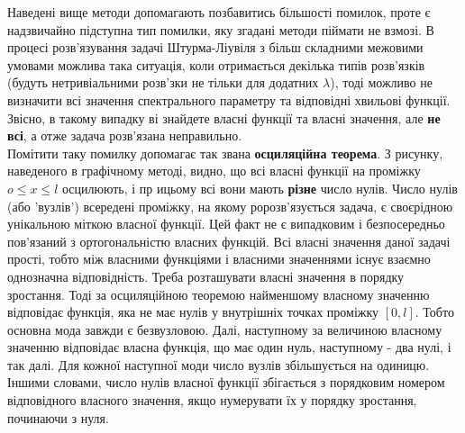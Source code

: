 \documentclass[a4paper, 14pt]{extreport}
\begin{document}
Наведені вище методи допомагають позбавитись більшості помилок, проте є надзвичайно підступна тип помилки, яку згадані методи піймати не взмозі. В процесі розв'язування задачі Штурма-Ліувіля з більш складними межовими умовами можлива така ситуація, коли отримається декілька типів розв'язків (будуть нетривіальними розв'зки не тільки для додатних $\lambda$), тоді можливо не визначити всі значення спектрального параметру та відповідні хвильові функції. Звісно, в такому випадку ві знайдете власні функції та власні значення, але \textbf{не всі}, а отже задача розв'язана неправильно.\\
Помітити таку помилку допомагає так звана \textbf{осциляційна теорема}. З рисунку, наведеного в графічному методі, видно, що всі власні функції на проміжку $o \leq x \leq l$ осцилюють, і пр ицьому всі вони мають \textbf{різне} число нулів. Число нулів (або 'вузлів') всередені проміжку, на якому ророзв’язується задача, є своєрідною унікальною міткою власної функції. Цей факт не є випадковим і безпосередньо пов’язаний з ортогональністю власних функцій. Всі власні значення даної задачі прості, тобто між власними функціями і власними значеннями існує взаємно однозначна відповідність. Треба розташувати власні значення в порядку зростання. Тоді за осциляційною теоремою найменшому власному значенню відповідає функція, яка не має нулів у внутрішніх точках проміжку $[0, l]$. Тобто основна мода завжди є безвузловою. Далі, наступному за величиною власному значенню відповідає власна функція, що має один нуль, наступному - два нулі, і так далі. Для кожної наступної моди число вузлів збільшується на одиницю. Іншими словами, число нулів власної функції збігається з порядковим номером відповідного власного значення, якщо нумерувати їх у порядку зростання, починаючи з нуля.
\end{document}

